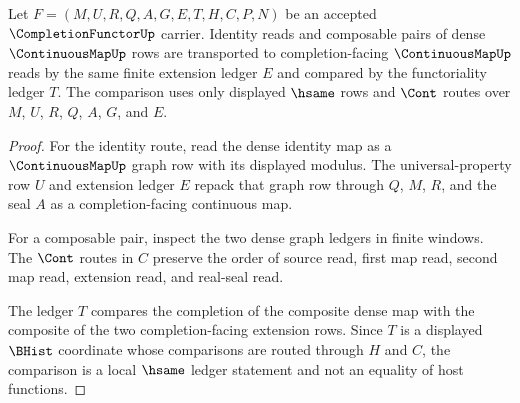 \begin{theorem}
\label{thm:completion-functor-functoriality}
Let $F=(M,U,R,Q,A,G,E,T,H,C,P,N)$ be an accepted $\CompletionFunctorUp$ carrier. Identity reads and composable pairs of dense $\ContinuousMapUp$ rows are transported to completion-facing $\ContinuousMapUp$ reads by the same finite extension ledger $E$ and compared by the functoriality ledger $T$. The comparison uses only displayed $\hsame$ rows and $\Cont$ routes over $M$, $U$, $R$, $Q$, $A$, $G$, and $E$.
\end{theorem}
\begin{proof}
For the identity route, read the dense identity map as a $\ContinuousMapUp$ graph row with its displayed modulus. The universal-property row $U$ and extension ledger $E$ repack that graph row through $Q$, $M$, $R$, and the seal $A$ as a completion-facing continuous map.

For a composable pair, inspect the two dense graph ledgers in finite windows. The $\Cont$ routes in $C$ preserve the order of source read, first map read, second map read, extension read, and real-seal read.

The ledger $T$ compares the completion of the composite dense map with the composite of the two completion-facing extension rows. Since $T$ is a displayed $\BHist$ coordinate whose comparisons are routed through $H$ and $C$, the comparison is a local $\hsame$ ledger statement and not an equality of host functions.
\end{proof}

